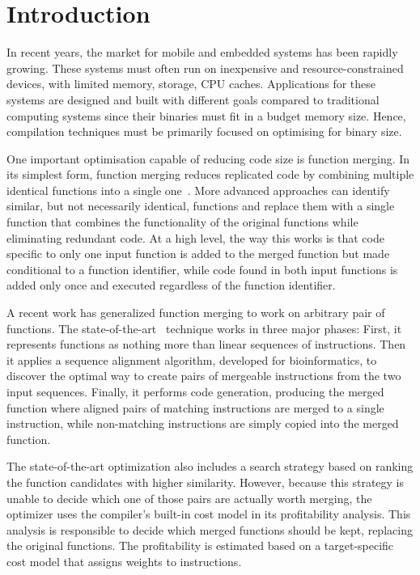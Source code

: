 \section{Introduction}
\label{sec:introduction}

In recent years, the market for mobile and embedded systems has been rapidly growing.
These systems must often run on inexpensive and resource-constrained devices, with limited memory, storage, CPU caches. %
Applications for these systems are designed and built with different goals compared to traditional computing systems since their binaries must fit in a budget memory size.
Hence, compilation techniques must be primarily focused on optimising for binary size.

One important optimisation capable of reducing code size is function merging.
In its simplest form, function merging reduces replicated code by combining multiple identical functions into a single one~\cite{llvm-fm,livska14}.
More advanced approaches can identify similar, but not necessarily identical, functions and replace them with a single function that combines the functionality of the original functions while eliminating redundant code.
At a high level, the way this works is that code specific to only one input function is added to the merged function but made conditional to a function identifier, while code found in both input functions is added only once and executed regardless of the function identifier.

A recent work has generalized function merging to work on arbitrary pair of functions.
The state-of-the-art~\cite{rocha19, rocha20} technique works in three major phases:
First, it represents functions as nothing more than linear sequences of instructions.
Then it applies a sequence alignment algorithm, developed for bioinformatics, to discover the optimal way to create pairs of mergeable instructions from the two input sequences.
Finally, it performs code generation, producing the merged function where aligned pairs of matching instructions are merged to a single instruction, while non-matching instructions are simply copied into the merged function.

The state-of-the-art optimization also includes a search strategy based on ranking the function candidates with higher similarity.
However, because this strategy is unable to decide which one of those pairs are actually worth merging, the optimizer uses the compiler's built-in cost model in its profitability analysis.
This analysis is responsible to decide which merged functions should be kept, replacing the original functions.
The profitability is estimated based on a target-specific cost model that assigns weights to instructions.

